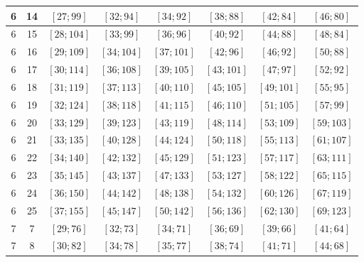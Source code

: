 \documentclass[a4paper,12pt]{article}
\begin{document}
\begin{center}
{\begin{longtable}[H]{|c|c|c|c|c|c|c|c|}
6 &  14 &  $\left[ 27; 99\right]$ &  $\left[ 32; 94\right]$ &  $\left[ 34; 92\right]$ &  $\left[ 38; 88\right]$ &  $\left[ 42; 84\right]$ &  $\left[ 46; 80\right]$ \tabularnewline \hline
6 &  15 &  $\left[ 28; 104\right]$ &  $\left[ 33; 99\right]$ &  $\left[ 36; 96\right]$ &  $\left[ 40; 92\right]$ &  $\left[ 44; 88\right]$ &  $\left[ 48; 84\right]$ \tabularnewline \hline
6 &  16 &  $\left[ 29; 109\right]$ &  $\left[ 34; 104\right]$ &  $\left[ 37; 101\right]$ &  $\left[ 42; 96\right]$ &  $\left[ 46; 92\right]$ &  $\left[ 50; 88\right]$ \tabularnewline \hline
6 &  17 &  $\left[ 30; 114\right]$ &  $\left[ 36; 108\right]$ &  $\left[ 39; 105\right]$ &  $\left[ 43; 101\right]$ &  $\left[ 47; 97\right]$ &  $\left[ 52; 92\right]$ \tabularnewline \hline
6 &  18 &  $\left[ 31; 119\right]$ &  $\left[ 37; 113\right]$ &  $\left[ 40; 110\right]$ &  $\left[ 45; 105\right]$ &  $\left[ 49; 101\right]$ &  $\left[ 55; 95\right]$ \tabularnewline \hline
6 &  19 &  $\left[ 32; 124\right]$ &  $\left[ 38; 118\right]$ &  $\left[ 41; 115\right]$ &  $\left[ 46; 110\right]$ &  $\left[ 51; 105\right]$ &  $\left[ 57; 99\right]$ \tabularnewline \hline
6 &  20 &  $\left[ 33; 129\right]$ &  $\left[ 39; 123\right]$ &  $\left[ 43; 119\right]$ &  $\left[ 48; 114\right]$ &  $\left[ 53; 109\right]$ &  $\left[ 59; 103\right]$ \tabularnewline \hline
6 &  21 &  $\left[ 33; 135\right]$ &  $\left[ 40; 128\right]$ &  $\left[ 44; 124\right]$ &  $\left[ 50; 118\right]$ &  $\left[ 55; 113\right]$ &  $\left[ 61; 107\right]$ \tabularnewline \hline
6 &  22 &  $\left[ 34; 140\right]$ &  $\left[ 42; 132\right]$ &  $\left[ 45; 129\right]$ &  $\left[ 51; 123\right]$ &  $\left[ 57; 117\right]$ &  $\left[ 63; 111\right]$ \tabularnewline \hline
6 &  23 &  $\left[ 35; 145\right]$ &  $\left[ 43; 137\right]$ &  $\left[ 47; 133\right]$ &  $\left[ 53; 127\right]$ &  $\left[ 58; 122\right]$ &  $\left[ 65; 115\right]$ \tabularnewline \hline
6 &  24 &  $\left[ 36; 150\right]$ &  $\left[ 44; 142\right]$ &  $\left[ 48; 138\right]$ &  $\left[ 54; 132\right]$ &  $\left[ 60; 126\right]$ &  $\left[ 67; 119\right]$ \tabularnewline \hline
6 &  25 &  $\left[ 37; 155\right]$ &  $\left[ 45; 147\right]$ &  $\left[ 50; 142\right]$ &  $\left[ 56; 136\right]$ &  $\left[ 62; 130\right]$ &  $\left[ 69; 123\right]$ \tabularnewline \hline
7 &  7 &  $\left[ 29; 76\right]$ &  $\left[ 32; 73\right]$ &  $\left[ 34; 71\right]$ &  $\left[ 36; 69\right]$ &  $\left[ 39; 66\right]$ &  $\left[ 41; 64\right]$ \tabularnewline \hline
7 &  8 &  $\left[ 30; 82\right]$ &  $\left[ 34; 78\right]$ &  $\left[ 35; 77\right]$ &  $\left[ 38; 74\right]$ &  $\left[ 41; 71\right]$ &  $\left[ 44; 68\right]$ \tabularnewline \hline

\end{longtable}}
\end{center}
\end{document}
